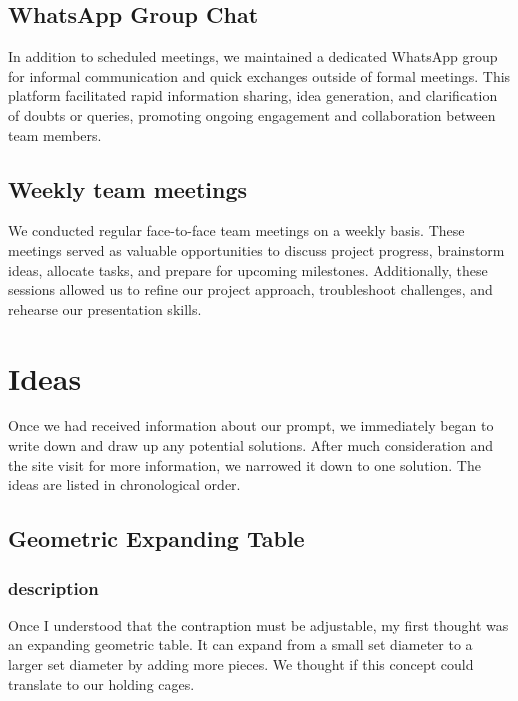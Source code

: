 \documentclass[a4paper,10pt]{article}
\begin{document}
\subsection{WhatsApp Group Chat}
 In addition to scheduled meetings, we maintained a dedicated WhatsApp group for informal communication and quick exchanges outside of formal meetings. This platform facilitated rapid information sharing, idea generation, and clarification of doubts or queries, promoting ongoing engagement and collaboration between team members.

\subsection{Weekly team meetings}
We conducted regular face-to-face team meetings on a weekly basis. These meetings served as valuable opportunities to discuss project progress, brainstorm ideas, allocate tasks, and prepare for upcoming milestones. Additionally, these sessions allowed us to refine our project approach, troubleshoot challenges, and rehearse our presentation skills.



\section{Ideas}
Once we had received information about our prompt, we immediately began to write down and draw up any potential solutions. After much consideration and the site visit for more information, we narrowed it down to one solution. The ideas are listed in chronological order.

\subsection{Geometric Expanding Table}

\subsubsection{description}

Once I understood that the contraption must be adjustable, my first thought was an expanding geometric table. It can expand from a small set diameter to a larger set diameter by adding more pieces. We thought if this concept could translate to our holding cages.
\end{document}
